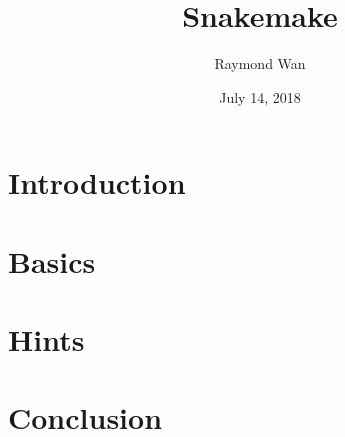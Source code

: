 \documentclass{beamer}
\begin{document}
\title{Snakemake}
\author{Raymond Wan}
\date{July 14, 2018}

\maketitle


\section{Introduction}





\section{Basics}





\section{Hints}





\section{Conclusion}



\end{document}
